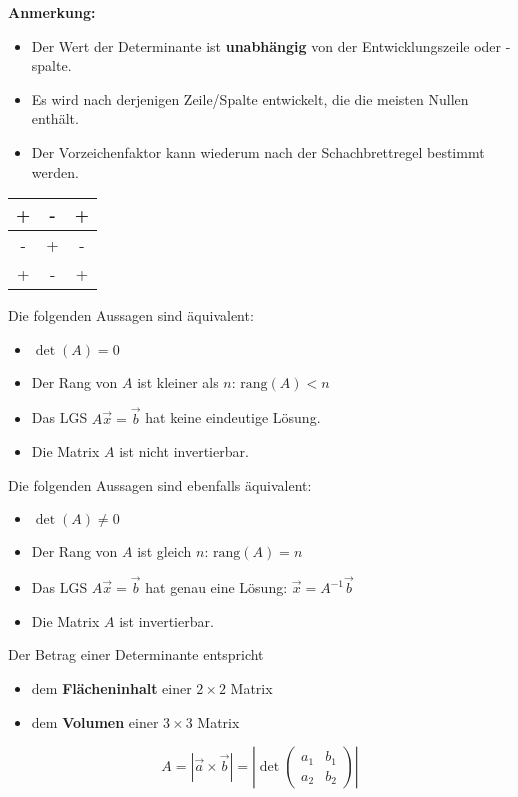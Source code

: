 \textbf{Anmerkung:}
\begin{itemize}
    \item Der Wert der Determinante ist \textbf{unabhängig} von der Entwicklungszeile oder -spalte.
    \item Es wird nach derjenigen Zeile/Spalte entwickelt, die die meisten Nullen enthält.
    \item Der Vorzeichenfaktor kann wiederum nach der Schachbrettregel bestimmt werden.
\end{itemize}
\vspace{-0.7em}
\begin{center}
    \begin{tabular}{|c|c|c|}
        \hline
        + & - & + \\
        \hline
        - & + & - \\
        \hline
        + & - & + \\
        \hline
    \end{tabular}
\end{center}
\vspace{-0.7em}


Die folgenden Aussagen sind äquivalent:
\begin{itemize}
    \item $\det(A) = 0$
    \item Der Rang von $A$ ist kleiner als $n$: $\text{rang}(A) < n$
    \item Das LGS $A \vec{x} = \vec{b}$ hat keine eindeutige Lösung.
    \item Die Matrix $A$ ist nicht invertierbar.
\end{itemize}

Die folgenden Aussagen sind ebenfalls äquivalent:
\begin{itemize}
    \item $\det(A) \neq 0$
    \item Der Rang von $A$ ist gleich $n$: $\text{rang}(A) = n$
    \item Das LGS $A \vec{x} = \vec{b}$ hat genau eine Lösung: $\vec{x} = A^{-1}\vec{b}$
    \item Die Matrix $A$ ist invertierbar.
\end{itemize}


Der Betrag einer Determinante entspricht
\begin{itemize}
    \item dem \textbf{Flächeninhalt} einer $2 \times 2$ Matrix
    \item dem \textbf{Volumen} einer $3 \times 3$ Matrix
\end{itemize}
\[A = |\vec{a} \times \vec{b}| = \left| \det \left(
\begin{array}{cc}
    a_1 & b_1 \\
    a_2 & b_2
\end{array}
\right)\right|\]